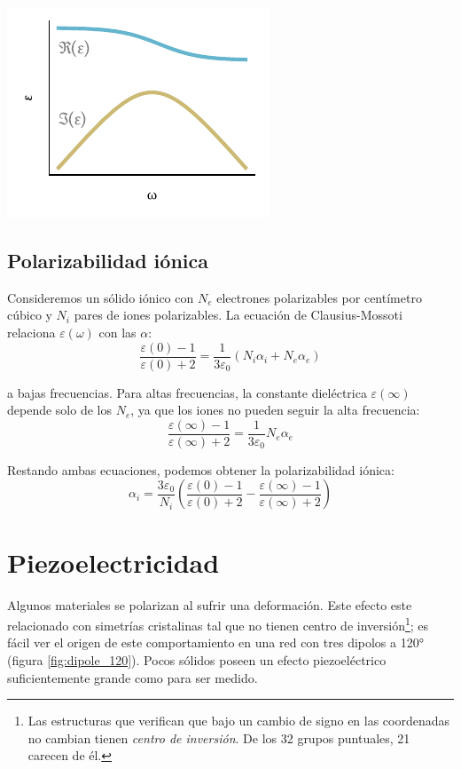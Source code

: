 \documentclass{tufte-book}
\begin{document}
\begin{marginfigure}
  \centering
    \includegraphics{figures/debyeeq.pdf}
  \caption{\itshape La parte imaginaria de la permitividad tiene un pico en
    $ω=\nicefrac{1}{τ}$. La gráfica está en escala logarítmica.}
  \label{fig:debyeeq}
\end{marginfigure}

\subsection{Polarizabilidad iónica}

Consideremos un sólido iónico con $N_e$ electrones polarizables por
centímetro cúbico y $N_i$ pares de iones polarizables. La ecuación de
Clausius-Mossoti relaciona $ε(ω)$ con las $α$:
\begin{equation}
  \frac{ε(0)-1}{ε(0)+2} = \frac{1}{3ε_0}(N_iα_i+N_eα_e)
\end{equation}

a bajas frecuencias. Para altas frecuencias, la constante dieléctrica
$ε(∞)$ depende solo de los $N_e$, ya que los iones no pueden
seguir la alta frecuencia:
\begin{equation}
  \frac{ε(∞) - 1}{ε(∞)+2} = \frac{1}{3ε_0} N_e α_e
\end{equation}

Restando ambas ecuaciones, podemos obtener la polarizabilidad iónica:
\begin{equation}
  α_i = \frac{3ε_0}{N_i} \left( \frac{ε(0)-1}{ε(0)+2} - \frac{ε(∞)-1}{ε(∞)+2} \right)
\end{equation}


\section{Piezoelectricidad}
Algunos materiales se polarizan al sufrir una deformación. Este efecto
este relacionado con simetrías cristalinas tal que no tienen centro de
inversión\footnote{
  Las estructuras que verifican que bajo un cambio de signo en las
  coordenadas no cambian tienen \emph{centro de inversión}. De los 32
  grupos puntuales, 21 carecen de él.
}; es fácil ver el origen de este comportamiento en una red con tres
dipolos a 120° (figura \ref{fig:dipole_120}). Pocos sólidos poseen un
efecto piezoeléctrico suficientemente grande como para ser medido.
\end{document}

